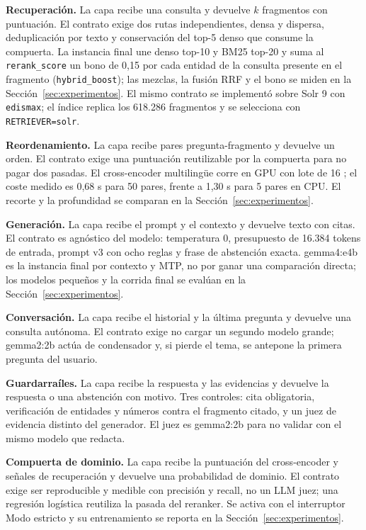 \textbf{Recuperaci\'on.} La capa recibe una consulta y devuelve $k$ fragmentos con puntuaci\'on. El contrato exige dos rutas independientes, densa y dispersa, deduplicaci\'on por texto y conservaci\'on del top-5 denso que consume la compuerta. La instancia final une denso top-10 y BM25 top-20 y suma al \texttt{rerank\_score} un bono de 0,15 por cada entidad de la consulta presente en el fragmento (\texttt{hybrid\_boost}); las mezclas, la fusi\'on RRF y el bono se miden en la Secci\'on~\ref{sec:experimentos}. El mismo contrato se implement\'o sobre Solr 9 con \texttt{edismax}; el \'indice replica los 618.286 fragmentos y se selecciona con \texttt{RETRIEVER=solr}.

\textbf{Reordenamiento.} La capa recibe pares pregunta-fragmento y devuelve un orden. El contrato exige una puntuaci\'on reutilizable por la compuerta para no pagar dos pasadas. El cross-encoder multiling\"ue corre en GPU con lote de 16 \cite{nogueira2019passage}; el coste medido es 0,68 s para 50 pares, frente a 1,30 s para 5 pares en CPU. El recorte y la profundidad se comparan en la Secci\'on~\ref{sec:experimentos}.

\textbf{Generaci\'on.} La capa recibe el prompt y el contexto y devuelve texto con citas. El contrato es agn\'ostico del modelo: temperatura 0, presupuesto de 16.384 tokens de entrada, prompt v3 con ocho reglas y frase de abstenci\'on exacta. gemma4:e4b es la instancia final por contexto y MTP, no por ganar una comparaci\'on directa; los modelos peque\~nos y la corrida final se eval\'uan en la Secci\'on~\ref{sec:experimentos}.

\textbf{Conversaci\'on.} La capa recibe el historial y la \'ultima pregunta y devuelve una consulta aut\'onoma. El contrato exige no cargar un segundo modelo grande; gemma2:2b act\'ua de condensador y, si pierde el tema, se antepone la primera pregunta del usuario.

\textbf{Guardarra\'iles.} La capa recibe la respuesta y las evidencias y devuelve la respuesta o una abstenci\'on con motivo. Tres controles: cita obligatoria, verificaci\'on de entidades y n\'umeros contra el fragmento citado, y un juez de evidencia distinto del generador. El juez es gemma2:2b para no validar con el mismo modelo que redacta.

\textbf{Compuerta de dominio.} La capa recibe la puntuaci\'on del cross-encoder y se\~nales de recuperaci\'on y devuelve una probabilidad de dominio. El contrato exige ser reproducible y medible con precisi\'on y recall, no un LLM juez; una regresi\'on log\'istica reutiliza la pasada del reranker. Se activa con el interruptor Modo estricto y su entrenamiento se reporta en la Secci\'on~\ref{sec:experimentos}.

